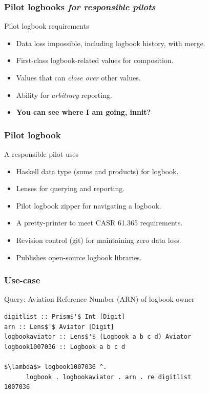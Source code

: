 \begin{frame}
\frametitle{Pilot logbooks \emph{for responsible pilots}}
\begin{block}{Pilot logbook requirements}
\begin{itemize}
\item<1-> Data loss impossible, including logbook history, with merge.
\item<2-> First-class logbook-related values for composition.
\item<3-> Values that can \emph{close over} other values.
\item<4-> Ability for \emph{arbitrary} reporting.
\item<5-> \textbf{You can see where I am going, innit?}
\end{itemize}
\end{block}
\end{frame}

\begin{frame}
\frametitle{Pilot logbook}
\begin{block}{A responsible pilot uses}
\begin{itemize}
\item<1-> Haskell data type (sums and products) for logbook.
\item<1-> Lenses for querying and reporting.
\item<1-> Pilot logbook zipper for navigating a logbook.
\item<1-> A pretty-printer to meet CASR 61.365 requirements.
\item<1-> Revision control (git) for maintaining zero data loss.
\item<1-> Publishes open-source logbook libraries.
\end{itemize}
\end{block}
\end{frame}

\begin{frame}[fragile]
\frametitle{Use-case}
\begin{block}{Query: Aviation Reference Number (ARN) of logbook owner}
\begin{lstlisting}[style=haskell,basicstyle=\scriptsize\ttfamily,mathescape]
digitlist :: Prism$'$ Int [Digit]
arn :: Lens$'$ Aviator [Digit]
logbookaviator :: Lens$'$ (Logbook a b c d) Aviator
logbook1007036 :: Logbook a b c d

$\lambda$> logbook1007036 ^.
      logbook . logbookaviator . arn . re digitlist
1007036
\end{lstlisting}
\end{block}
\end{frame}

